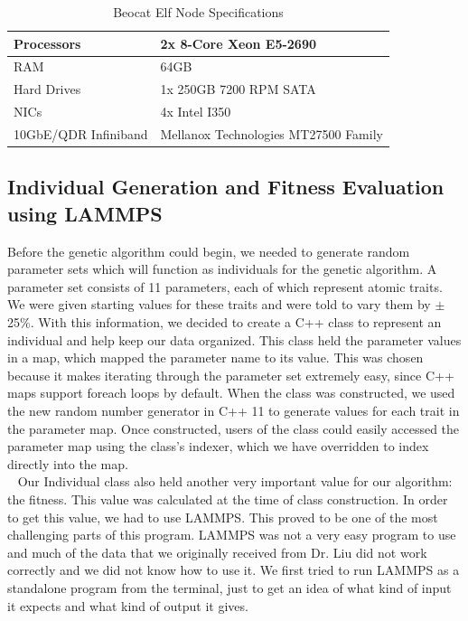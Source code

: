 \documentclass[letterpaper, 12pt]{article}
\begin{document}
\begin{flushleft}
\begin{table}[ht]
	\centering
	\caption{Beocat Elf Node Specifications}
	\label{nodespecs}
	\begin{tabular}{|l|l|}
		\hline
		Processors           & 2x 8-Core Xeon E5-2690               \\ \hline
		RAM                  & 64GB                                 \\ \hline
		Hard Drives          & 1x 250GB 7200 RPM SATA               \\ \hline
		NICs                 & 4x Intel I350                        \\ \hline
		10GbE/QDR Infiniband & Mellanox Technologies MT27500 Family \\ \hline
	\end{tabular}
\end{table}

\subsection*{Individual Generation and Fitness Evaluation using LAMMPS}

Before the genetic algorithm could begin, we needed to generate random parameter sets which will function as individuals for the genetic algorithm. 
A parameter set consists of 11 parameters, each of which represent atomic traits. We were given starting values for these traits and were told to vary them by $\pm$ 25\%. 
With this information, we decided to create a C++ class to represent an individual and help keep our data organized. This class held the parameter values in a map, which mapped the parameter name to its value. 
This was chosen because it makes iterating through the parameter set extremely easy, since C++ maps support foreach loops by default. When the class was constructed, we used the new
random number generator in C++ 11 to generate values for each trait in the parameter map. Once constructed, users of the class could easily accessed the parameter map using the class's 
indexer, which we have overridden to index directly into the map. \\
~\newline
Our Individual class also held another very important value for our algorithm: the fitness. This value was calculated at the time of class construction. In order to get this value,
we had to use LAMMPS. This proved to be one of the most challenging parts of this program. LAMMPS was not a very easy program to use and much of the data that we originally received
from Dr. Liu did not work correctly and we did not know how to use it. We first tried to run LAMMPS as a standalone program from the terminal, just to get an idea of what kind of
input it expects and what kind of output it gives. 


\end{flushleft}
\end{document}
